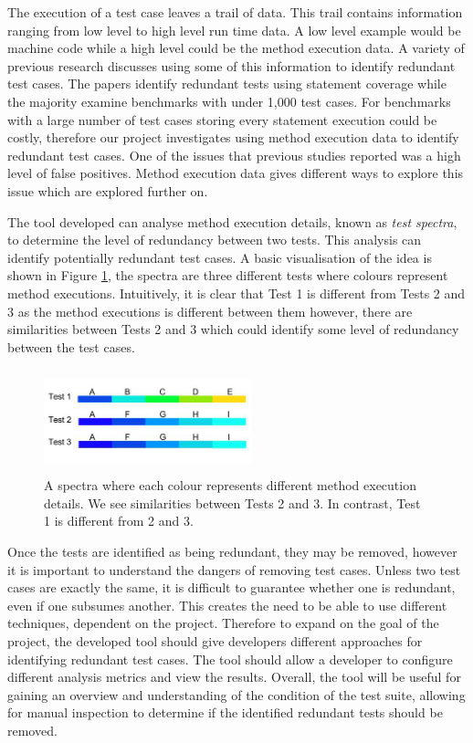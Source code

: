 \documentclass[11pt
              , a4paper
              , twoside
              , openright
              ]{report}
\begin{document}
The execution of a test case leaves a trail of data. This trail contains information ranging from low level to high level run time data. A low level example would be machine code while a high level could be the method execution data. A variety of previous research \cite{wong1995effect, wong1999test, rothermel1998empirical, rothermel2002empirical,koochakzadeh2009test,zhang2011empirical,li2008static} discusses using some of this information to identify redundant test cases. The papers identify redundant tests using statement coverage while the majority examine benchmarks with under 1,000 test cases. For benchmarks with a large number of test cases storing every statement execution could be costly, therefore our project investigates using method execution data to identify redundant test cases. One of the issues that previous studies reported was a high level of false positives. Method execution data gives different ways to explore this issue which are explored further on. 

The tool developed can analyse method execution details, known as \textit{test spectra}, to determine the level of redundancy between two tests. This analysis can identify potentially redundant test cases. A basic visualisation of the idea is shown in Figure \ref{fig:spectra}, the spectra are three different tests where colours represent method executions. Intuitively, it is clear that Test 1 is different from Tests 2 and 3 as the method executions is different between them however, there are similarities between Tests 2 and 3 which could identify some level of redundancy between the test cases. 

\begin{figure}[h]
\centering
\includegraphics[width=6cm,height=3cm]{spectra.png}
\caption{A spectra where each colour represents different method execution details. We see similarities between Tests 2 and 3. In contrast, Test 1 is different from 2 and 3. }
\label{fig:spectra}
\end{figure}

Once the tests are identified as being redundant, they may be removed, however it is important to understand the dangers of removing test cases. Unless two test cases are exactly the same, it is difficult to guarantee whether one is redundant, even if one subsumes another. This creates the need to be able to use different techniques, dependent on the project. Therefore to expand on the goal of the project, the developed tool should give developers different approaches for identifying redundant test cases. The tool should allow a developer to configure different analysis metrics and view the results. Overall, the tool will be useful for gaining an overview and understanding of the condition of the test suite, allowing for manual inspection to determine if the identified redundant tests should be removed.
\end{document}
